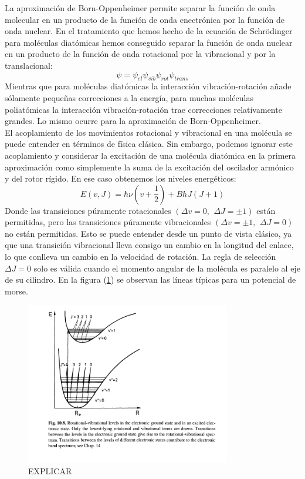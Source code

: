 \documentclass[a4paper]{article}
\begin{document}
La aproximación de Born-Oppenheimer permite separar la función de onda molecular en un producto de la función de onda enectrónica por la función de onda nuclear. En el tratamiento que hemos hecho de la ecuación de Schrödinger para moléculas diatómicas hemos conseguido separar la función de onda nuclear en un producto de la función de onda rotacional por la vibracional y por la translacional:
\begin{equation}
\psi=\psi_{el}\psi_{vib}\psi_{rot}\psi_{trans}
\end{equation}
Mientras que para moléculas diatómicas la interacción vibración-rotación añade sólamente pequeñas correcciones a la energía, para muchas moléculas poliatómicas la interacción vibración-rotación trae correcciones relativamente grandes. Lo mismo ocurre para la aproximación de Born-Oppenheimer.\\

El acoplamiento de los movimientos rotacional y vibracional en una molécula se puede entender en términos de física clásica. Sin embargo, podemos ignorar este acoplamiento y considerar la excitación de una molécula diatómica en la primera aproximación como simplemente la suma de la excitación del oscilador armónico y del rotor rígido. En ese caso obtenemos los niveles energéticos:
\begin{equation}
E(v,J)=\hbar\nu(v+\frac{1}{2})+ BhJ(J+1)
\end{equation}
Donde  las transiciones púramente rotacionales $(\Delta v = 0, \,\ \Delta J = \pm 1)$ están permitidas, pero las transiciones púramente vibracionales $(\Delta v = \pm 1, \,\ \Delta J = 0)$ no están permitidas. Esto se puede entender desde un punto de vista clásico, ya que una transición vibracional lleva consigo un cambio en la longitud del enlace, lo que conlleva un cambio en la velocidad de rotación. La regla de selección $\Delta J=0$ solo es válida cuando el momento angular de la molécula es paralelo al eje de su cilindro.
En la figura (\ref{transiciones}) se observan las líneas típicas para un potencial de morse.
\begin{figure}
\includegraphics[width=0.8\textwidth]{niv_rot_vib_elect.png}
\caption{EXPLICAR}
\label{transiciones}
\end{figure}
\newpage
\printbibliography
\end{document}
